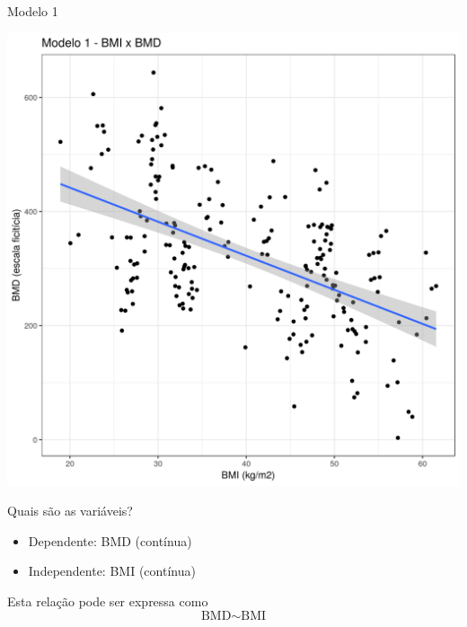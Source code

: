 \documentclass{beamer}
\begin{document}
\begin{frame}{\small Modelo 1}
  \begin{center}
    \includegraphics[height=.9\textheight]{Cap31-32/pratica-rlm1}
  \end{center}
\end{frame}

\begin{frame}{Quais são as variáveis?}
  \begin{itemize}
  \item Dependente: BMD (contínua)
  \item Independente: BMI (contínua)
  \end{itemize}
  \vfill
  \begin{block}{Esta relação pode ser expressa como}
    \begin{displaymath}
      \text{BMD} \sim \text{BMI}
    \end{displaymath}
  \end{block}
\end{frame}
\end{document}
